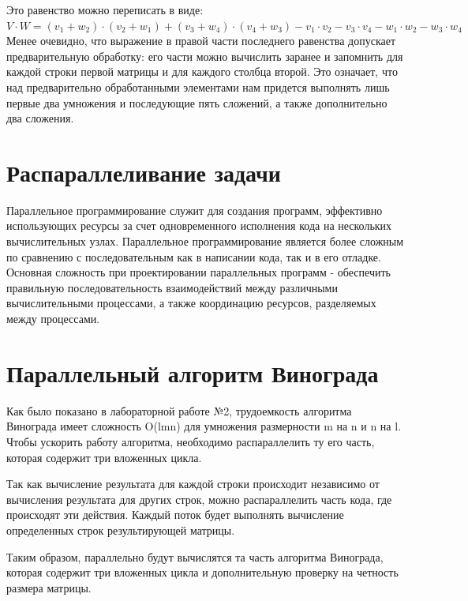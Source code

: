 \documentclass[a4paper,14pt]{report}
\begin{document}
Это равенство можно переписать в виде: \\
$V \cdot W=(v_1 + w_2) \cdot (v_2 + w_1) + (v_3 + w_4) \cdot (v_4 + w_3) - v_1 \cdot v_2 - v_3 \cdot v_4 - w_1 \cdot w_2 - w_3 \cdot w_4$\\

Менее очевидно, что выражение в правой части последнего равенства допускает предварительную обработку: его части можно вычислить заранее и запомнить для каждой строки первой матрицы и для каждого столбца второй.
Это означает, что над предварительно обработанными элементами нам придется выполнять лишь первые два умножения и последующие пять сложений, а также дополнительно два сложения.

\section*{Распараллеливание задачи}

Параллельное программирование служит для создания программ, эффективно использующих ресурсы за счет одновременного исполнения кода на нескольких вычислительных узлах. Параллельное программирование является более сложным по сравнению с последовательным как в написании кода, так и в его отладке. Основная сложность при проектировании параллельных программ - обеспечить правильную последовательность взаимодействий между различными вычислительными процессами, а также координацию ресурсов, разделяемых между процессами.

\section*{Параллельный алгоритм Винограда}

Как было показано в лабораторной работе №2, трудоемкость алгоритма Винограда имеет сложность O(lmn) для умножения размерности m на n и n на l. Чтобы ускорить работу алгоритма, необходимо распараллелить ту его часть, которая содержит три вложенных цикла.

Так как вычисление результата для каждой строки происходит независимо от вычисления результата для других строк, можно распараллелить часть кода, где происходят эти действия. Каждый поток будет выполнять вычисление определенных строк результирующей матрицы.

Таким образом, параллельно будут вычислятся та часть алгоритма Винограда, которая содержит три вложенных цикла и дополнительную проверку на четность размера матрицы.
\end{document}
